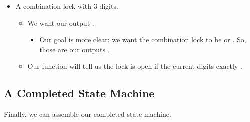 \begin{itemize}
            \item A combination lock with 3 digits.
                \begin{itemize}
                    \item We want our output . 
                        \begin{itemize}
                            \item Our goal is more clear: we want the combination lock to be  or . So, those are our outputs .
                        \end{itemize}
                        
                    \item Our function  will tell us the lock is open if the current digits exactly .
                \end{itemize}
        \end{itemize}


    \pagebreak

    \subsection{A Completed State Machine}

        Finally, we can assemble our completed state machine.\\
        

